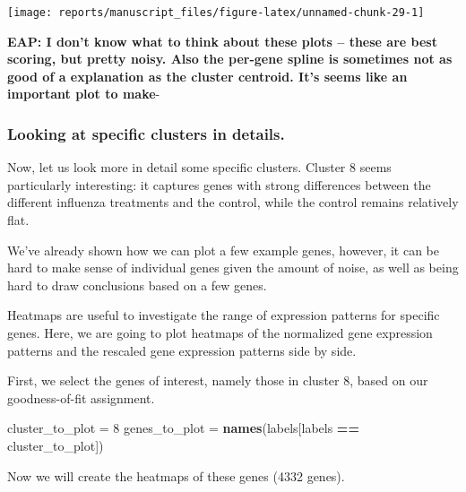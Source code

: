 \documentclass[9pt,a4paper,]{extarticle}
\newenvironment{Shaded}{\begin{snugshade}}{\end{snugshade}}
\newcommand{\DecValTok}[1]{\textcolor[rgb]{0.00,0.00,0.81}{#1}}
\newcommand{\KeywordTok}[1]{\textcolor[rgb]{0.13,0.29,0.53}{\textbf{#1}}}
\newcommand{\NormalTok}[1]{#1}
\newcommand{\OperatorTok}[1]{\textcolor[rgb]{0.81,0.36,0.00}{\textbf{#1}}}
\newcommand{\StringTok}[1]{\textcolor[rgb]{0.31,0.60,0.02}{#1}}
\begin{document}
\begin{center}\texttt{[image: reports/manuscript\_files/figure-latex/unnamed-chunk-29-1]} \end{center}

\textbf{EAP: I don't know what to think about these plots -- these are best scoring, but pretty noisy. Also the per-gene spline is sometimes not as good of a explanation as the cluster centroid. It's seems like an important plot to make}-

\hypertarget{looking-at-specific-clusters-in-details.}{%
\subsubsection{Looking at specific clusters in details.}\label{looking-at-specific-clusters-in-details.}}

Now, let us look more in detail some specific clusters. Cluster 8 seems
particularly interesting: it captures genes with strong differences between
the different influenza treatments and the control, while the control remains
relatively flat.

We've already shown how we can plot a few example genes, however, it can be
hard to make sense of individual genes given the amount of noise, as well as
being hard to draw conclusions based on a few genes.

Heatmaps are useful to investigate the range of expression patterns for
specific genes. Here, we are going to plot heatmaps of the normalized gene
expression patterns and the rescaled gene expression patterns side by side.

First, we select the genes of interest, namely those in cluster 8, based on
our goodness-of-fit assignment.

\begin{Shaded}
\begin{Highlighting}[]
\NormalTok{cluster_to_plot =}\StringTok{ }\DecValTok{8}
\NormalTok{genes_to_plot =}\StringTok{  }\KeywordTok{names}\NormalTok{(labels[labels }\OperatorTok{==}\StringTok{ }\NormalTok{cluster_to_plot])}
\end{Highlighting}
\end{Shaded}

Now we will create the heatmaps of these genes (4332 genes).
\end{document}
